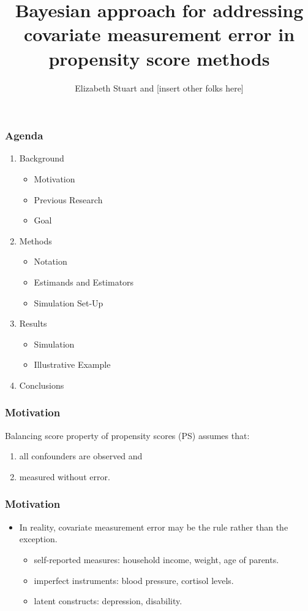 \documentclass{beamer}
\title{Bayesian approach for addressing covariate measurement error in propensity score methods}
\author{Elizabeth Stuart and [insert other folks here]}
\date{}                                           %
\begin{document}
\begin{frame}
\titlepage
\end{frame}

\begin{frame}
\frametitle{Agenda}
\begin{enumerate}
\item Background
\begin{itemize}
\item Motivation
\item Previous Research
\item Goal
\end{itemize}
\item Methods
\begin{itemize}
\item Notation
	\item Estimands and Estimators
	\item Simulation Set-Up
\end{itemize}
\item Results
\begin{itemize}
	\item Simulation
	\item Illustrative Example
\end{itemize}
\item Conclusions
\end{enumerate}
\end{frame}

\begin{frame}
\frametitle{Motivation}

Balancing score property of propensity scores (PS) assumes that:
\begin{enumerate}
\item all confounders are observed and 
\item measured without error.
\end{enumerate}
\end{frame}

\begin{frame}
\frametitle{ Motivation}

\begin{itemize}
\item In reality, covariate measurement error may be the rule rather than the exception. 
\begin{itemize}
	\item self-reported measures: household income, weight, age of parents.
	\item imperfect instruments: blood pressure, cortisol levels.
	\item latent constructs: depression, disability.
\end{itemize}
\end{itemize}

 
\end{frame}
\end{document}
